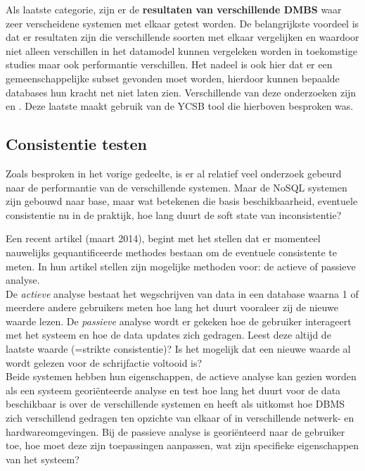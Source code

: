 Als laatste categorie, zijn er de \textbf{resultaten van verschillende DMBS} waar zeer verscheidene systemen met elkaar getest worden. De belangrijkste voordeel is dat er resultaten zijn die verschillende soorten met elkaar vergelijken en waardoor niet alleen verschillen in het datamodel kunnen vergeleken worden in toekomstige studies maar ook performantie verschillen. Het nadeel is ook hier dat er een gemeenschappelijke subset gevonden moet worden, hierdoor kunnen bepaalde databases hun kracht net niet laten zien. Verschillende van deze onderzoeken zijn \cite{tudorica2011comparison} en \cite{rabl2012solving}. Deze laatste maakt gebruik van de YCSB tool die hierboven besproken was. 


\subsection{Consistentie testen}
Zoals besproken in het vorige gedeelte, is er al relatief veel onderzoek gebeurd naar de performantie van de verschillende systemen. Maar de NoSQL systemen zijn gebouwd naar \gls{base}, maar wat betekenen die basis beschikbaarheid, eventuele consistentie nu in de praktijk, hoe lang duurt de soft state van inconsistentie?

Een recent artikel \cite{golab2014eventually} (maart 2014), begint met het stellen dat er momenteel nauwelijks gequantificeerde methodes bestaan om de eventuele consistente te meten. In hun artikel stellen zijn mogelijke methoden voor: de actieve of passieve analyse. \\
De \textit{actieve} analyse bestaat het wegschrijven van data in een database waarna 1 of meerdere andere gebruikers meten hoe lang het duurt vooraleer zij de nieuwe waarde lezen. 
De \textit{passieve} analyse wordt er gekeken hoe de gebruiker interageert met het systeem en hoe de data updates zich gedragen. Leest deze altijd de laatste waarde (=strikte consistentie)? Is het mogelijk dat een nieuwe waarde al wordt gelezen voor de schrijfactie voltooid is? \\
Beide systemen hebben hun eigenschappen, de actieve analyse kan gezien worden als een systeem georiënteerde analyse en test hoe lang het duurt voor de data beschikbaar is over de verschillende systemen en heeft als uitkomst hoe DBMS zich verschillend gedragen ten opzichte van elkaar of in verschillende netwerk- en hardwareomgevingen. 
Bij de passieve analyse is georiënteerd naar de gebruiker toe, hoe moet deze zijn toepassingen aanpassen, wat zijn specifieke eigenschappen van het systeem? 

